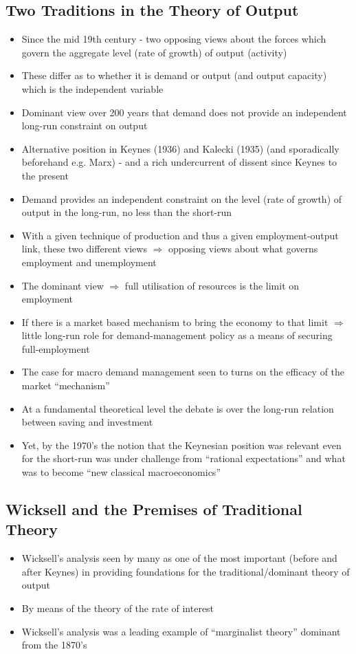 \documentclass{article}
\begin{document}
\subsection{Two Traditions in the Theory of Output}
	\begin{itemize}
		\item Since the mid 19th century - two opposing views about the forces which govern the aggregate level (rate of growth) of output (activity)
		\item These differ as to whether it is demand or output (and output capacity) which is the independent variable
		\item Dominant view over 200 years that demand does not provide an independent long-run constraint on output
		\item Alternative position in Keynes (1936) and Kalecki (1935) (and sporadically beforehand e.g. Marx) - and a rich undercurrent of dissent since Keynes to the present
		\item Demand provides an independent constraint on the level (rate of growth) of output in the long-run, no less than the short-run
		\item With a given technique of production and thus a given employment-output link, these two different views \( \Rightarrow \) opposing views about what governs employment and unemployment
		\item The dominant view \( \Rightarrow \) full utilisation of resources is the limit on employment
		\item If there is a market based mechanism to bring the economy to that limit \( \Rightarrow \) little long-run role for demand-management policy as a means of securing full-employment
		\item The case for macro demand management seen to turns on the efficacy of the market ``mechanism''
		\item At a fundamental theoretical level the debate is over the long-run relation between saving and investment
		\item Yet, by the 1970's the notion that the Keynesian position was relevant even for the short-run was under challenge from ``rational expectations'' and what was to become ``new classical macroeconomics''
	\end{itemize}
\subsection{Wicksell and the Premises of Traditional Theory}
	\begin{itemize}
		\item Wicksell's analysis seen by many as one of the most important (before and after Keynes) in providing foundations for the traditional/dominant theory of output
		\item By means of the theory of the rate of interest
		\item Wicksell's analysis was a leading example of ``marginalist theory'' dominant from the 1870's
	\end{itemize}
\end{document}
